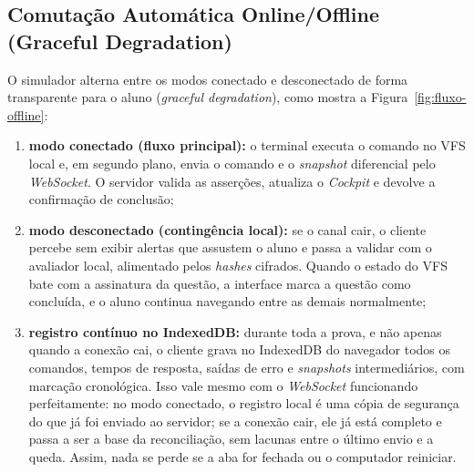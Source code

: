 \subsection{Comutação Automática Online/Offline (Graceful Degradation)}
\label{sec:comutacao-offline}

O simulador alterna entre os modos conectado e desconectado de forma transparente para o aluno (\textit{graceful degradation}), como mostra a Figura~\ref{fig:fluxo-offline}:

\begin{enumerate}
    \item \textbf{modo conectado (fluxo principal):} o terminal executa o comando no VFS local e, em segundo plano, envia o comando e o \textit{snapshot} diferencial pelo \textit{WebSocket}. O servidor valida as asserções, atualiza o \textit{Cockpit} e devolve a confirmação de conclusão;
    \item \textbf{modo desconectado (contingência local):} se o canal cair, o cliente percebe sem exibir alertas que assustem o aluno e passa a validar com o avaliador local, alimentado pelos \textit{hashes} cifrados. Quando o estado do VFS bate com a assinatura da questão, a interface marca a questão como concluída, e o aluno continua navegando entre as demais normalmente;
    \item \textbf{registro contínuo no IndexedDB:} durante toda a prova, e não apenas quando a conexão cai, o cliente grava no IndexedDB do navegador \cite{w3c2015indexeddb} todos os comandos, tempos de resposta, saídas de erro e \textit{snapshots} intermediários, com marcação cronológica. Isso vale mesmo com o \textit{WebSocket} funcionando perfeitamente: no modo conectado, o registro local é uma cópia de segurança do que já foi enviado ao servidor; se a conexão cair, ele já está completo e passa a ser a base da reconciliação, sem lacunas entre o último envio e a queda. Assim, nada se perde se a aba for fechada ou o computador reiniciar.
\end{enumerate}

